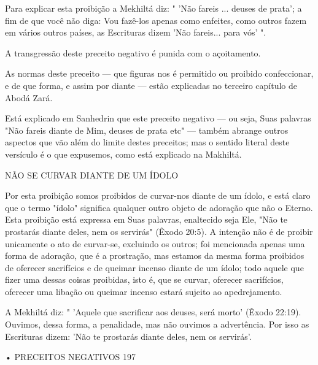 Para explicar esta proibição a Mekhiltá diz: " 'Não fareis ... deuses de
prata'; a fim de que você não diga: Vou fazê-los apenas como enfeites,
como outros fazem em vários outros países, as Escrituras dizem 'Não
fareis... para vós' ".

A transgressão deste preceito negativo é punida com o açoitamento.

As normas deste preceito --- que figuras nos é permitido ou proibi­do
confeccionar, e de que forma, e assim por diante --- estão explicadas no
ter­ceiro capítulo de Abodá Zará.

Está explicado em Sanhedrin que este preceito negativo --- ou seja, Suas
palavras "Não fareis diante de Mim, deuses de prata etc" --- também
abrange outros aspectos que vão além do limite destes preceitos; mas o
sentido literal deste versículo é o que expusemos, como está explicado
na Makhiltá.

NÃO SE CURVAR DIANTE DE UM ÍDOLO

Por esta proibição somos proibidos de curvar-nos diante de um ído­lo, e
está claro que o termo "ídolo" significa qualquer outro objeto de
adora­ção que não o Eterno. Esta proibição está expressa em Suas
palavras, enalteci­do seja Ele, "Não te prostarás diante deles, nem os
servirás" (Êxodo 20:5). A intenção não é de proibir unicamente o ato de
curvar-se, excluindo os outros; foi mencionada apenas uma forma de
adoração, que é a prostração, mas esta­mos da mesma forma proibidos de
oferecer sacrifícios e de queimar incenso diante de um ídolo; todo
aquele que fizer uma dessas coisas proibidas, isto é, que se curvar,
oferecer sacrifícios, oferecer uma libação ou queimar incenso estará
sujeito ao apedrejamento.

A Mekhiltá diz: " 'Aquele que sacrificar aos deuses, será morto' (Êxo­do
22:19). Ouvimos, dessa forma, a penalidade, mas não ouvimos a
advertên­cia. Por isso as Escrituras dizem: 'Não te prostarás diante
deles, nem os servirás'.

• PRECEITOS NEGATIVOS 197

